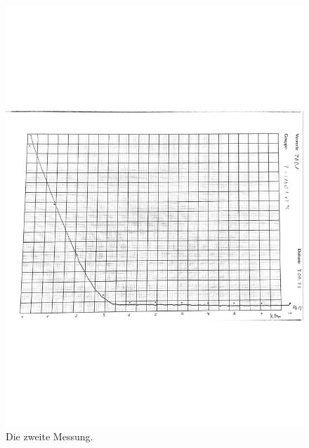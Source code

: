 \begin{figure}
    \centering
    \includegraphics[width=\linewidth]{pictures/kurve2_1.pdf}
    \caption{Die zweite Messung.}
    \label{fig:kurve2}
\end{figure}

